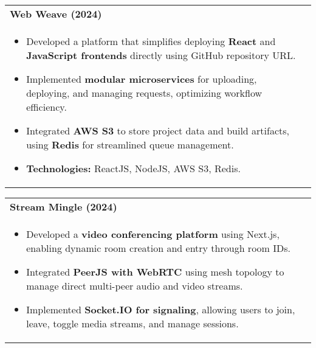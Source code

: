\documentclass[a4paper,8pt]{article}
\begin{document}
\vspace{-2pt}

\begin{tabularx}{\linewidth}{ @{}l r@{} }
\textbf{Web Weave (2024)} \hfill \color[HTML]{371e77} \\[1pt]
\begin{minipage}[t]{\linewidth}
    \begin{itemize}[nosep,after=\strut, leftmargin=2em, itemsep=2pt]
        \item Developed a platform that simplifies deploying \textbf{React} and \textbf{JavaScript frontends} directly using GitHub repository URL.
        \item Implemented \textbf{modular microservices} for uploading, deploying, and managing requests, optimizing workflow efficiency.
        \item Integrated \textbf{AWS S3} to store project data and build artifacts, using \textbf{Redis} for streamlined queue management.
        \item \textbf{Technologies:} ReactJS, NodeJS, AWS S3, Redis.
    \end{itemize}
\end{minipage}
\end{tabularx}

\vspace{-2pt}

\begin{tabularx}{\linewidth}{ @{}l r@{} }
\textbf{Stream Mingle (2024)} \hfill \color[HTML]{371e77} \\[1pt]
\begin{minipage}[t]{\linewidth}
    \begin{itemize}[nosep,after=\strut, leftmargin=2em, itemsep=2pt]
        \item Developed a \textbf{video conferencing platform} using Next.js, enabling dynamic room creation and entry through room IDs.
        \item Integrated \textbf{PeerJS with WebRTC} using mesh topology to manage direct multi-peer audio and video streams.
        \item Implemented \textbf{Socket.IO for signaling}, allowing users to join, leave, toggle media streams, and manage sessions.
    \end{itemize}
\end{minipage}
\end{tabularx}
\end{document}
